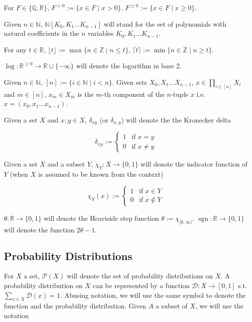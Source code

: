 \documentclass{article}
\numberwithin{equation}{section}
\theoremstyle{definition}
\theoremstyle{plain}
\newcommand{\Bool}{\{0,1\}}
\DeclareMathOperator{\Sgn}{sgn}
\newcommand{\Nats}{\mathbb{N}}
\newcommand{\Ints}{\mathbb{Z}}
\newcommand{\Rats}{\mathbb{Q}}
\newcommand{\Reals}{\mathbb{R}}
\newcommand{\NatPoly}{\Nats[K_0, K_1 \ldots K_{n-1}]}
\newcommand{\Floor}[1]{\lfloor #1 \rfloor}
\newcommand{\Ceil}[1]{\lceil #1 \rceil}
\newcommand{\Dist}{\mathcal{D}}
\begin{document}
For $F \in \{\Rats,\Reals\}$, $F^{>0} := \{x \in F \mid x > 0\}$, $F^{\geq 0} := \{x \in F \mid x \geq 0\}$.

Given ${n \in \Nats}$, ${\NatPoly}$ will stand for the set of polynomials with natural coefficients in the ${n}$ variables ${K_0, K_1 \ldots K_{n-1}}$.

For any $t \in \Reals$, $\Floor{t} := \max \{n \in \Ints \mid n \leq t\}$, $\Ceil{t} := \min \{n \in \Ints \mid n \geq t\}$.

$\log: \Reals^{\geq 0} \rightarrow \Reals \sqcup \{-\infty\}$ will denote the logarithm in base 2.

Given $n \in \Nats$, $[n]:=\{i \in \Nats \mid i < n\}$. Given sets $X_0, X_1 \ldots X_{n-1}$, ${x \in \prod_{i \in [n]} X_i}$ and $m \in [n]$, $x_m \in X_m$ is the $m$-th component of the $n$-tuple $x$ i.e. ${x=(x_0, x_1 \ldots x_{n-1})}$.

Given a set $X$ and $x,y \in X$, $\delta_{xy}$ (or $\delta_{x,y})$ will denote the the Kronecker delta

$$\delta_{xy} := \begin{cases}1 & \text{if } x=y \\ 0 & \text{if } x \ne y \end{cases}$$

Given a set $X$ and a subset $Y$, $\chi_Y: X \rightarrow \Bool$ will denote the indicator function of $Y$ (when $X$ is assumed to be known from the context)

$$\chi_Y(x):=\begin{cases}1 & \text{if } x \in Y \\ 0 & \text{if } x \not\in Y \end{cases}$$

$\theta: \Reals \rightarrow \Bool$ will denote the Heaviside step function $\theta:=\chi_{[0,\infty)}$. ${\Sgn: \Reals \rightarrow \Bool}$ will denote the function $2 \theta - 1$.

\subsection{Probability Distributions}

For ${X}$ a set, ${\mathcal{P}(X)}$ will denote the set of probability distributions on ${X}$. A probability distribution on $X$ can be represented by a function $\Dist: X \rightarrow [0,1]$ s.t. $\sum_{x \in X} \Dist(x) = 1$. Abusing notation, we will use the same symbol to denote the function and the probability distribution. Given ${A}$ a subset of ${X}$, we will use the notation
\end{document}
